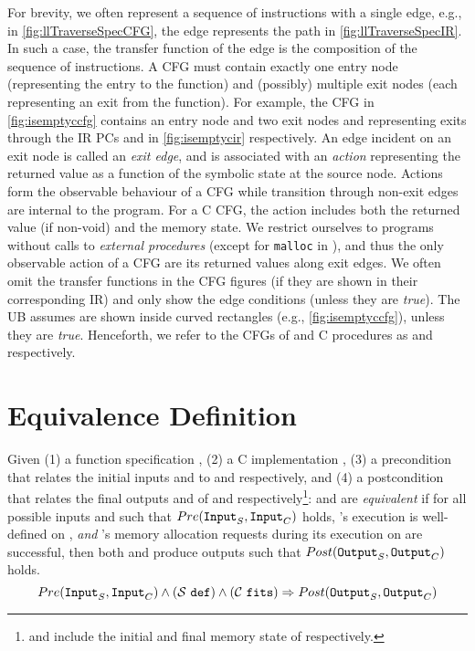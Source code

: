 For brevity, we often represent a sequence of instructions with a single edge, e.g.,
in \cref{fig:llTraverseSpecCFG}, the edge  represents the path  in \cref{fig:llTraverseSpecIR}.
In such a case, the transfer function of the edge is the composition of the sequence of instructions.
A CFG must contain exactly one entry node (representing the entry to the function) and (possibly)
multiple exit nodes (each representing an exit from the function).
For example, the CFG in \cref{fig:isemptyccfg} contains an entry node  and two exit nodes
 and  representing exits through the IR PCs  and  in \cref{fig:isemptycir} respectively.
An edge incident on an exit node is called an {\em exit edge}, and is associated with an {\em action} representing
the returned value as a function of the symbolic state at the source node.
Actions form the observable behaviour of a CFG while transition through non-exit edges are internal to the program.
For a C CFG, the action includes both the returned value (if non-void) and the memory state.
We restrict ourselves to programs without calls to {\em external procedures} (except for {\tt malloc} in \cprog{}),
and thus the only observable action of a CFG are its returned values along exit edges.
We often omit the transfer functions in the CFG figures (if they are shown in their corresponding IR)
and only show the edge conditions (unless they are {\em true}).
The UB assumes are shown inside curved rectangles (e.g., \cref{fig:isemptyccfg}), unless they are {\em true}.
Henceforth, we refer to the CFGs of \SpecL{} and C procedures as \sprog{} and \cprog{} respectively.
\newpage
\section{Equivalence Definition}
\label{sec:eqdef}
Given (1) a \SpecL{} function specification \sprog{}, (2) a C implementation \cprog{},
(3) a precondition \pre{} that relates the initial inputs  and  to
\sprog{} and \cprog{} respectively, and (4) a postcondition \post{} that relates the final outputs
 and  of \sprog{} and \cprog{} respectively\footnote{ and 
include the initial and final memory state of \cprog{} respectively.}:
\sprog{} and \cprog{} are {\em equivalent} if for all possible inputs  and  such that
${Pre}{}({\tt Input}_{S},{\tt Input}_{C})$ holds,
\sprog{}'s execution is well-defined on , {\em and}
\cprog{}'s memory allocation requests during its execution on  are successful,
then both \sprog{} and \cprog{} produce outputs such that ${Post}{}({\tt Output}_{S},{\tt Output}_{C})$ holds.
$$
{Pre}{}({\tt Input}_{S},{\tt Input}_{C}) \land {({\ensuremath{\mathcal{S}}}{}\ {\tt def})}{} \land {({\ensuremath{\mathcal{C}}}{}\ {\tt fits})}{} \Rightarrow {\ensuremath{Post}}{}({\tt Output}_{S},{\tt Output}_{C})
$$

